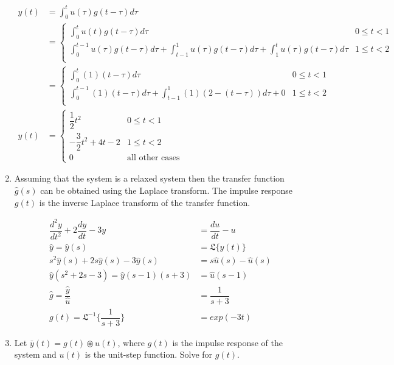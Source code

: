 \documentclass[a4paper,12pt]{article}
\begin{document}
\begin{enumerate}
\begin{align*}
 y(t) &= \int_{0}^{t} u(\tau) g(t-\tau)d\tau\\
 &= \begin{cases}
     \int_{0}^{t} u(t) g(t-\tau) d\tau & 0 \leq t < 1\\
     \int_{0}^{t-1} u(\tau) g(t-\tau)d\tau + \int_{t-1}^{1} u(\tau) g(t-\tau)d\tau + \int_{1}^{t} u(\tau) g(t-\tau)d\tau & 1 \leq t < 2\\
    \end{cases}
    \\
     &= \begin{cases}
     \int_{0}^{t} (1) (t-\tau) d\tau & 0 \leq t < 1\\
     \int_{0}^{t-1} (1) (t-\tau)d\tau + \int_{t-1}^{1} (1) (2-(t-\tau))d\tau + 0 & 1 \leq t < 2\\
    \end{cases}
    \\
     y(t) &= \begin{cases}
     \dfrac{1}{2}t^2 & 0 \leq t < 1\\
     -\dfrac{3}{2}t^2 + 4t - 2 & 1 \leq t < 2\\
     0 & \text{all other cases}
    \end{cases}
\end{align*}



\item Assuming that the system is a relaxed system then the transfer function $\hat{g}(s)$ can be obtained using the Laplace transform.
The impulse response $g(t)$ is the inverse Laplace transform of the transfer function.

\begin{align*}
  \dfrac{d^2 y}{dt^2} + 2 \dfrac{d y}{dt}  - 3 y &= \dfrac{du}{dt} - u \\
\hat{y} = \hat{y}(s) &= \mathfrak{L} \{y(t)\}\\
  s^2 \hat{y} (s) + 2 s \hat{y} (s) - 3 \hat{y}(s) &= s \hat{u}(s) - \hat{u}(s)\\
  \hat{y} (s^2 +2s -3) = \hat{y} (s-1) (s+3)  &= \hat{u} (s-1) \\
  \hat{g} = \dfrac{\hat{y}}{\hat{u}} &= \dfrac{1}{s+3}\\
  g(t) = \mathfrak{L}^{-1} \{\dfrac{1}{s+3}\} &= exp(-3t)
\end{align*}
\item Let $\bar y(t) = g(t) \circledast u(t)$, where $g(t)$ is the impulse response of the system and $u(t)$ is the unit-step function.
Solve for $g(t)$.


\end{enumerate}
\end{document}
